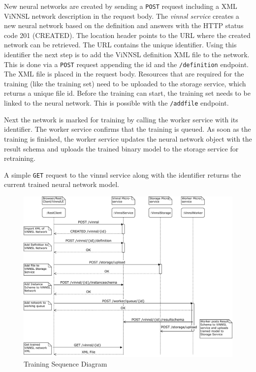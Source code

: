 New neural networks are created by sending a \texttt{POST} request
including a XML ViNNSL network description in the request body. The
\emph{vinnsl service} creates a new neural network based on the
definition and answers with the HTTP status code 201 (CREATED). The
location header points to the URL where the created network can be
retrieved. The URL contains the unique identifier. Using this identifier
the next step is to add the ViNNSL definition XML file to the network.
This is done via a \texttt{POST} request appending the id and the
\texttt{/definition} endpoint. The XML file is placed in the request
body. Resources that are required for the training (like the training
set) need to be uploaded to the storage service, which returns a unique
file id. Before the training can start, the training set needs to be
linked to the neural network. This is possible with the
\texttt{/addfile} endpoint.

Next the network is marked for training by calling the worker service
with its identifier. The worker service confirms that the training is
queued. As soon as the training is finished, the worker service updates
the neural network object with the result schema and uploads the trained
binary model to the storage service for retraining.

A simple \texttt{GET} request to the vinnsl service along with the
identifier returns the current trained neural network model.

\begin{figure}
\centering
\includegraphics[width=15.00000cm]{images/training_sequence}
\caption{Training Sequence Diagram \label{img.training_sequence}}
\end{figure}

